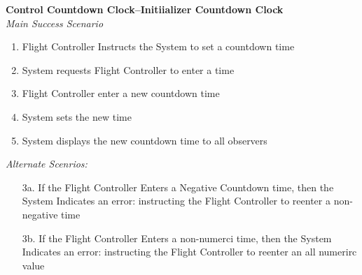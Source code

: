 \documentclass[letterpaper]{article}
\begin{document}
\noindent
\textbf{Control Countdown Clock--Initiializer Countdown Clock}\\
\textit{Main Success Scenario}
\begin{enumerate}
\item Flight Controller Instructs the System to set a countdown time
\item System requests Flight Controller to enter a time
\item Flight Controller enter a new countdown time
\item System sets the new time
\item System displays the new countdown time to all observers
\end{enumerate}
\textit{Alternate Scenrios:}
\begin{itemize}
\item[3a.]If the Flight Controller Enters a Negative Countdown time,
then the System Indicates an error:  instructing the Flight Controller
to reenter a non-negative time
\item[3b.]If the Flight Controller Enters a non-numerci time, then the
System Indicates an error:  instructing the Flight Controller to
reenter an all numerirc value
\end{itemize}
\end{document}
